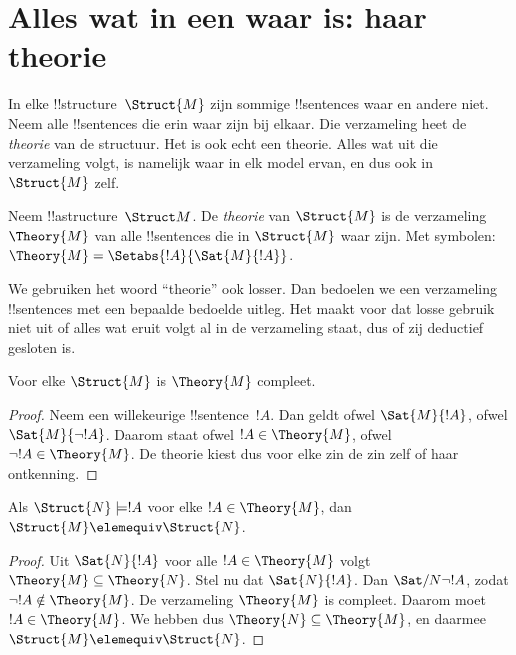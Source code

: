 \documentclass[../../../include/open-logic-section]{subfiles}
\begin{document}

\section{Alles wat in een  waar is: haar theorie}

In elke !!{structure}~$\Struct{M}$ zijn sommige !!{sentence}s waar en
andere niet. Neem alle !!{sentence}s die erin waar zijn bij elkaar. Die
verzameling heet de \emph{theorie} van de structuur. Het is ook echt een
theorie. Alles wat uit die verzameling volgt, is namelijk waar in elk
model ervan, en dus ook in~$\Struct{M}$ zelf.

\begin{defn}
  Neem !!a{structure}~$\Struct M$. De \emph{theorie} van
  $\Struct{M}$ is de verzameling $\Theory{M}$ van alle !!{sentence}s
  die in $\Struct{M}$ waar zijn. Met symbolen: $\Theory{M} =
  \Setabs{!A}{\Sat{M}{!A}}$.
\end{defn}

We gebruiken het woord ``theorie'' ook losser. Dan bedoelen we een
verzameling !!{sentence}s met een bepaalde bedoelde uitleg. Het maakt
voor dat losse gebruik niet uit of alles wat eruit volgt al in de
verzameling staat, dus of zij deductief gesloten is.

\begin{prop}
Voor elke $\Struct{M}$ is $\Theory{M}$ compleet.
\end{prop}

\begin{proof}
Neem een willekeurige !!{sentence}~$!A$. Dan geldt ofwel
$\Sat{M}{!A}$, ofwel $\Sat{M}{\lnot !A}$. Daarom staat ofwel
$!A \in \Theory{M}$, ofwel $\lnot !A \in \Theory{M}$. De theorie kiest
dus voor elke zin de zin zelf of haar ontkenning.
\end{proof}

\begin{prop}
  Als $\Struct{N} \models !A$ voor elke $!A \in \Theory{M}$, dan
  $\Struct{M} \elemequiv \Struct{N}$.
\end{prop}

\begin{proof}
Uit $\Sat{N}{!A}$ voor alle $!A \in \Theory{M}$ volgt
$\Theory{M} \subseteq \Theory{N}$. Stel nu dat $\Sat{N}{!A}$. Dan
$\Sat/{N}{\lnot !A}$, zodat $\lnot !A \notin \Theory{M}$. De verzameling
$\Theory{M}$ is compleet. Daarom moet $!A \in \Theory{M}$. We hebben dus
$\Theory{N} \subseteq \Theory{M}$, en daarmee
$\Struct{M} \elemequiv \Struct{N}$.
\end{proof}
\end{document}
